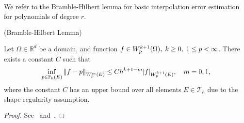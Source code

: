 We refer to the Bramble-Hilbert lemma for basic interpolation error estimation for polynomials of degree $r$.
\begin{lem}\label{lem:BHlemma}
(Bramble-Hilbert Lemma)

		  Let $\Omega \in \mathbb{R}^d$ be a domain, and function $f \in W^{k+1}_p(\Omega), \hspace{0.1cm} k \geq 0,\hspace{0.1cm}  1\leq p < \infty$. There exists a constant $C$
such that
\begin{equation}
		  \inf_{p\in \mathbb{P}_{k}(E)} \left\lVert f-p\right\rVert_{W^m_p(E)} \leq C h^{k+1-m}\lvert f \rvert_{W^{k+1}_p(E)}, \quad m=0,1,
\end{equation}
where the constant $C$ has an upper bound over all 
		  elements $E \in \mathcal{T}_h$ due to the shape regularity assumption.
\end{lem}
\begin{proof}
		  See~\cite{EstimationofLinearFunctionals} and~\cite{ddd3654d-28ed-3763-8d70-a82ea44a3d31}.
\end{proof}
